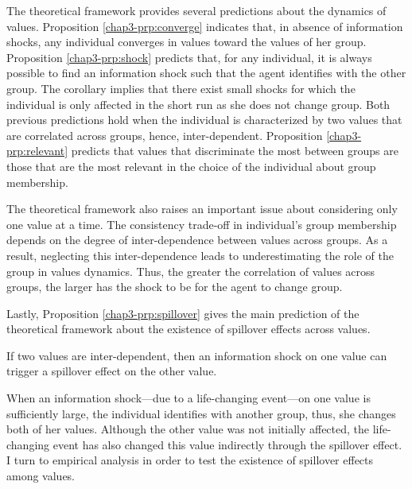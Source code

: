 The theoretical framework provides several predictions about the dynamics of values. 
Proposition \ref{chap3-prp:converge} indicates that, in absence of information shocks, any individual converges in values toward the values of her group.
Proposition \ref{chap3-prp:shock} predicts that, for any individual, it is always possible to find an information shock such that the agent identifies with the other group. The corollary implies that there exist small shocks for which the individual is only affected in the short run as she does not change group.
Both previous predictions hold when the individual is characterized by two values that are correlated across groups, hence, inter-dependent.
Proposition \ref{chap3-prp:relevant} predicts that values that discriminate the most between groups are those that are the most relevant in the choice of the individual about group membership.

The theoretical framework also raises an important issue about considering only one value at a time. The consistency trade-off in individual's group membership depends on the degree of inter-dependence between values across groups. As a result, neglecting this inter-dependence leads to underestimating the role of the group in values dynamics. Thus, the greater the correlation of values across groups, the larger has the shock to be for the agent to change group.

Lastly, Proposition \ref{chap3-prp:spillover} gives the main prediction of the theoretical framework about the existence of spillover effects across values.
\begin{proposition}\label{chap3-prp:spillover}
    If two values are inter-dependent, then an information shock on one value can trigger a spillover effect on the other value.
\end{proposition}
When an information shock---due to a life-changing event---on one value is sufficiently large, the individual identifies with another group, thus, she changes both of her values. Although the other value was not initially affected, the life-changing event has also changed this value indirectly through the spillover effect. I turn to empirical analysis in order to test the existence of spillover effects among values.